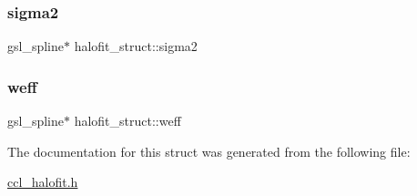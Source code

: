 \subsubsection{\texorpdfstring{sigma2}{sigma2}}
{\footnotesize\ttfamily gsl\+\_\+spline$\ast$ halofit\+\_\+struct\+::sigma2}

\mbox{\label{structhalofit__struct_ab9795d46477327605470d72b589aa162}} 
\subsubsection{\texorpdfstring{weff}{weff}}
{\footnotesize\ttfamily gsl\+\_\+spline$\ast$ halofit\+\_\+struct\+::weff}



The documentation for this struct was generated from the following file\+:\begin{DoxyCompactItemize}
\item 
\mbox{\hyperlink{ccl__halofit_8h}{ccl\+\_\+halofit.\+h}}\end{DoxyCompactItemize}
